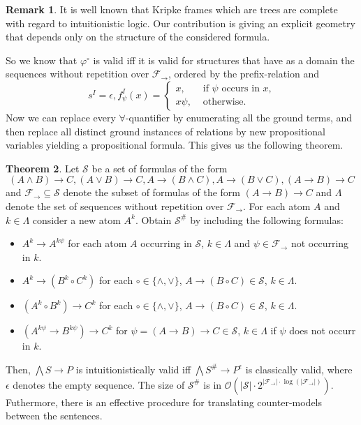 \documentclass[a4paper,12pt]{report}
\theoremstyle{definition}
\newtheorem{theorem}{Theorem}[section]
\theoremstyle{definition}
\theoremstyle{definition}
\theoremstyle{definition}
\theoremstyle{definition}
\theoremstyle{definition}
\theoremstyle{definition}
\newtheorem{remark}[theorem]{Remark}
\begin{document}
	
	\begin{remark}
		It is well known that Kripke frames which are trees are complete with regard to intuitionistic logic. Our contribution is giving an explicit geometry that depends only on the structure of the considered formula.
	\end{remark}
	
	
	So we know that $\varphi^\circ$ is valid iff it is valid for structures that have as a domain the sequences without repetition over $\mathcal F_\to$, ordered by the prefix-relation and $$s^I = \epsilon, f_\psi^I(x) = \begin{cases}
		x, &\text{ if $\psi$ occurs in $x$,}\\
		x\psi, &\text{ otherwise.}
	\end{cases}$$
	Now we can replace every $\forall$-quantifier by enumerating all the ground terms, and then replace all distinct ground instances of relations by new propositional variables yielding a propositional formula. This gives us the following theorem.
	
	\begin{theorem}
		Let $\mathcal S$ be a set of formulas of the form
		$$(A\wedge B)\to C, (A\vee B)\to C, A\to (B\wedge C), A\to(B\vee C), (A\to B)\to C$$
		and $\mathcal F_\to\subseteq\mathcal S$ denote the subset of formulas of the form $(A\to B)\to C$ and $\Lambda$ denote the set of sequences without repetition over $\mathcal F_\to$. For each atom $A$ and $k\in\Lambda$ consider a new atom $A^k$. Obtain $\mathcal S^\#$ by including the following formulas:
		\begin{itemize}
			\item $A^k\to A^{k\psi}$ for each atom $A$ occurring in $\mathcal S$, $k\in\Lambda$ and $\psi\in\mathcal F_\to$ not occurring in $k$.
			\item $A^k\to (B^k\circ C^k)$ for each $\circ\in\{\wedge,\vee\}$, $A\to (B\circ C)\in\mathcal S$, $k\in\Lambda$.
			\item $(A^k\circ B^k)\to C^k$ for each $\circ\in\{\wedge,\vee\}$, $A\to (B\circ C)\in\mathcal S$, $k\in\Lambda$.
			\item $(A^{k\psi}\to B^{k\psi})\to C^k$ for $\psi = (A\to B)\to C\in\mathcal S$, $k\in\Lambda$ if $\psi$ does not occurr in $k$.
		\end{itemize}
		Then, $\bigwedge S\to P$ is intuitionistically valid iff $\bigwedge S^\#\to P^\epsilon$ is classically valid, where $\epsilon$ denotes the empty sequence. The size of $\mathcal S^\#$ is in $\mathcal O(|\mathcal S|\cdot2^{|\mathcal F_\to|\cdot\log(|\mathcal F_\to|)})$. Futhermore, there is an effective procedure for translating counter-models between the sentences.
	\end{theorem}
\end{document}
